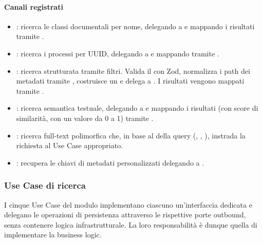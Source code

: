 \paragraph{Canali registrati}

\begin{itemize}
    \item {} : ricerca le classi documentali per nome, delegando a  e mappando i risultati 
    tramite .
    \item {} : ricerca i processi per UUID, delegando a  e mappando tramite .
    \item {} : ricerca strutturata tramite filtri. Valida il  con Zod, normalizza i path dei metadati 
    tramite , costruisce un  e delega a . I risultati vengono
     mappati tramite .
    \item {} : ricerca semantica testuale, delegando a  e mappando i risultati (con score di similarità, con un valore da 0 a 1) 
    tramite .
    \item {} : ricerca full-text polimorfica che, in base al  della query (, 
    , ), instrada la richiesta al Use Case appropriato.
    \item {} : recupera le chiavi di metadati personalizzati delegando a .
\end{itemize}

\subsubsection{Use Case di ricerca}

I cinque Use Case del modulo implementano ciascuno un'interfaccia dedicata e delegano le operazioni di persistenza attraverso le rispettive porte outbound, senza contenere logica infrastrutturale. La loro responsabilità è dunque quella di implementare la business logic.

